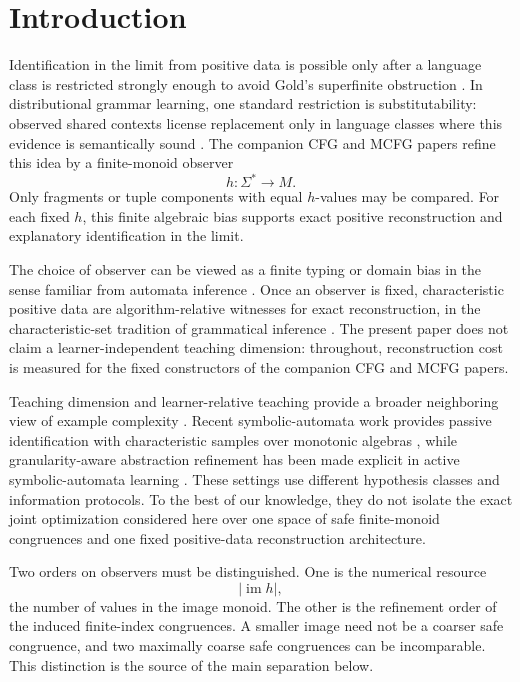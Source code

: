 \documentclass[11pt]{article}
\theoremstyle{definition}
\theoremstyle{remark}
\newcommand{\im}{\operatorname{im}}
\begin{document}
\section{Introduction}

Identification in the limit from positive data is possible only after a
language class is restricted strongly enough to avoid Gold's superfinite
obstruction \cite{Gold1967}.  In distributional grammar learning, one standard
restriction is substitutability: observed shared contexts license replacement
only in language classes where this evidence is semantically sound
\cite{ClarkEyraud2007,Yoshinaka2011}.  The companion CFG and MCFG papers
\cite{KuriyamaCFG,KuriyamaMCFG} refine this idea by a finite-monoid observer
\[
 h:\Sigma^*\to M.
\]
Only fragments or tuple components with equal \(h\)-values may be compared.
For each fixed \(h\), this finite algebraic bias supports exact positive
reconstruction and explanatory identification in the limit.

The choice of observer can be viewed as a finite typing or domain bias in the
sense familiar from automata inference \cite{CosteEtAl2004}.  Once an observer
is fixed, characteristic positive data are algorithm-relative witnesses for
exact reconstruction, in the characteristic-set tradition of grammatical
inference \cite{Higuera1997}.  The present paper does not claim a
learner-independent teaching dimension: throughout, reconstruction cost is
measured for the fixed constructors of the companion CFG and MCFG papers.

Teaching dimension and learner-relative teaching provide a broader neighboring
view of example complexity \cite{GoldmanKearns1995,GoldmanMathias1996}.
Recent symbolic-automata work provides passive identification with
characteristic samples over monotonic algebras
\cite{HabermehlLoulergue2026}, while granularity-aware abstraction refinement
has been made explicit in active symbolic-automata learning
\cite{KimChoi2026}.  These settings use different hypothesis classes and
information protocols.  To the best of our knowledge,
they do not isolate the exact joint optimization considered here over one
space of safe finite-monoid congruences and one fixed positive-data
reconstruction architecture.

Two orders on observers must be distinguished.  One is the numerical resource
\[
 |\im h|,
\]
the number of values in the image monoid.  The other is the refinement order
of the induced finite-index congruences.  A smaller image need not be a
coarser safe congruence, and two maximally coarse safe congruences can be incomparable.
This distinction is the source of the main separation below.
\end{document}
